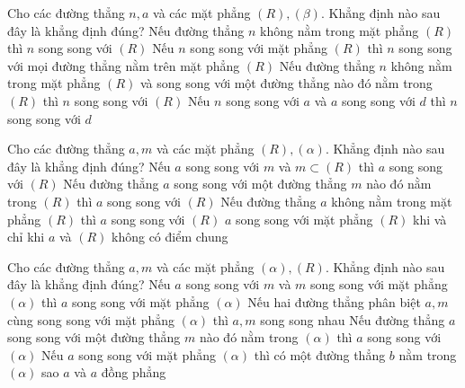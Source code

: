 \documentclass[12pt,a4paper]{article}
\begin{document}
\begin{ex}
	Cho các đường thẳng ${n,a}$ và các mặt phẳng ${(R), (\beta)}$. Khẳng định nào sau đây là khẳng định đúng? 
	\choice
	{ Nếu đường thẳng ${n}$ không nằm trong mặt phẳng ${(R)}$ thì ${n}$ song song với ${(R)}$ }
	{ Nếu ${n}$ song song với mặt phẳng ${(R)}$ thì ${n}$ song song với mọi đường thẳng nằm trên mặt phẳng ${(R)}$ }
	{ \True Nếu đường thẳng ${n}$ không nằm trong mặt phẳng ${(R)}$ và song song với một đường thẳng nào đó nằm trong ${(R)}$ thì ${n}$ song song với ${(R)}$ }
	{ Nếu ${n}$ song song với ${a}$ và ${a}$ song song với ${d}$ thì ${n}$ song song với ${d}$ }
	\end{ex}

\begin{ex}
	Cho các đường thẳng ${a,m}$ và các mặt phẳng ${(R), (\alpha)}$. Khẳng định nào sau đây là khẳng định đúng? 
	\choice
	{ Nếu ${a}$ song song với ${m}$ và $m\subset (R)$ thì ${a}$ song song với ${(R)}$ }
	{ Nếu đường thẳng ${a}$ song song với một đường thẳng ${m}$ nào đó nằm trong ${(R)}$ thì ${a}$ song song với ${(R)}$ }
	{ Nếu đường thẳng ${a}$ không nằm trong mặt phẳng ${(R)}$ thì ${a}$ song song với ${(R)}$ }
	{ \True ${a}$ song song với mặt phẳng ${(R)}$ khi và chỉ khi ${a}$ và ${(R)}$ không có điểm chung }
	\end{ex}

\begin{ex}
	Cho các đường thẳng ${a,m}$ và các mặt phẳng ${(\alpha), (R)}$. Khẳng định nào sau đây là khẳng định đúng? 
	\choice
	{ Nếu ${a}$ song song với ${m}$ và ${m}$ song song với mặt phẳng ${(\alpha)}$ thì ${a}$ song song với mặt phẳng ${(\alpha)}$ }
	{ Nếu hai đường thẳng phân biệt ${a,m}$ cùng song song với mặt phẳng ${(\alpha)}$ thì ${a,m}$ song song nhau }
	{ Nếu đường thẳng ${a}$ song song với một đường thẳng ${m}$ nào đó nằm trong ${(\alpha)}$ thì ${a}$ song song với ${(\alpha)}$ }
	{ \True Nếu ${a}$ song song với mặt phẳng ${(\alpha)}$ thì có một đường thẳng ${b}$ nằm trong ${(\alpha)}$ sao ${a}$ và ${a}$ đồng phẳng }
	\end{ex}
\end{document}

